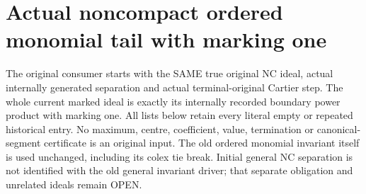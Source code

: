 \section{Actual noncompact ordered monomial tail with marking one}
\label{sec:hironaka-normal-crossings-ordered-monomial-tail}

The original consumer starts with the SAME true original NC ideal, actual
internally generated separation and actual terminal-original Cartier step.
The whole current marked ideal is exactly its internally recorded boundary
power product with marking one. All lists below retain every literal empty
or repeated historical entry. No maximum, centre, coefficient, value,
termination or canonical-segment certificate is an original input. The old
ordered monomial invariant itself is used unchanged, including its colex tie
break. Initial general NC separation is not identified with the old general
invariant driver; that separate obligation and unrelated ideals remain OPEN.

